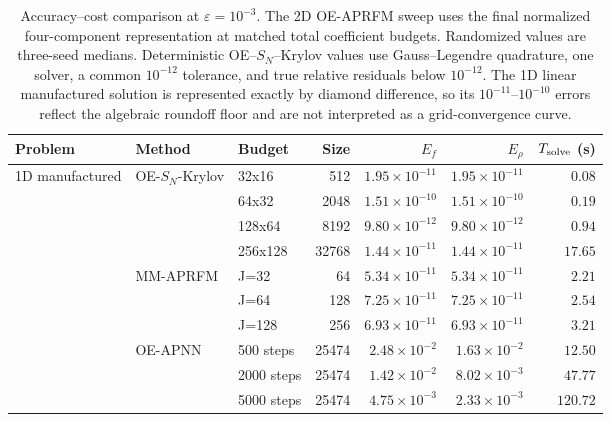 \begin{table}[t]
\centering
\caption{Accuracy--cost comparison at $\varepsilon=10^{-3}$. The 2D OE-APRFM sweep uses the final normalized four-component representation at matched total coefficient budgets. Randomized values are three-seed medians. Deterministic OE--$S_N$--Krylov values use Gauss--Legendre quadrature, one solver, a common $10^{-12}$ tolerance, and true relative residuals below $10^{-12}$. The 1D linear manufactured solution is represented exactly by diamond difference, so its $10^{-11}$--$10^{-10}$ errors reflect the algebraic roundoff floor and are not interpreted as a grid-convergence curve.}
\label{tab:accuracy-cost}
\begin{tabular}{lllrrrr}
\toprule
Problem & Method & Budget & Size & $E_f$ & $E_\rho$ & $T_{\rm solve}$ (s)\\
\midrule
1D manufactured & OE-$S_N$-Krylov & 32x16 & 512 & $1.95\times10^{-11}$ & $1.95\times10^{-11}$ & $0.08$\\
 &  & 64x32 & 2048 & $1.51\times10^{-10}$ & $1.51\times10^{-10}$ & $0.19$\\
 &  & 128x64 & 8192 & $9.80\times10^{-12}$ & $9.80\times10^{-12}$ & $0.94$\\
 &  & 256x128 & 32768 & $1.44\times10^{-11}$ & $1.44\times10^{-11}$ & $17.65$\\
 & MM-APRFM & J=32 & 64 & $5.34\times10^{-11}$ & $5.34\times10^{-11}$ & $2.21$\\
 &  & J=64 & 128 & $7.25\times10^{-11}$ & $7.25\times10^{-11}$ & $2.54$\\
 &  & J=128 & 256 & $6.93\times10^{-11}$ & $6.93\times10^{-11}$ & $3.21$\\
 & OE-APNN & 500 steps & 25474 & $2.48\times10^{-2}$ & $1.63\times10^{-2}$ & $12.50$\\
 &  & 2000 steps & 25474 & $1.42\times10^{-2}$ & $8.02\times10^{-3}$ & $47.77$\\
 &  & 5000 steps & 25474 & $4.75\times10^{-3}$ & $2.33\times10^{-3}$ & $120.72$\\

\end{tabular}
\end{table}

